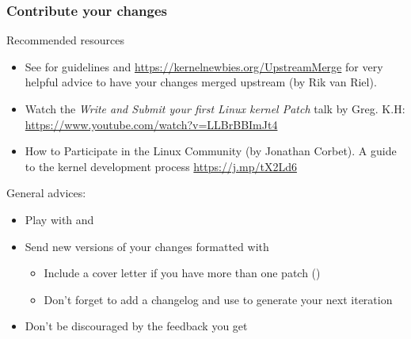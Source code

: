 \begin{frame}
  \frametitle{Contribute your changes}
  Recommended resources
  \begin{itemize}
  \item See  for guidelines
    and \url{https://kernelnewbies.org/UpstreamMerge} for very
    helpful advice to have your changes merged upstream (by Rik van
    Riel).
  \item Watch the \emph{Write and Submit your first Linux kernel
      Patch} talk by Greg. K.H:
    \url{https://www.youtube.com/watch?v=LLBrBBImJt4}
  \item How to Participate in the Linux Community (by Jonathan
    Corbet). A guide to the kernel development process
    \url{https://j.mp/tX2Ld6}
  \end{itemize}
  General advices:
  \begin{itemize}
  \item Play with  and 
  \item Send new versions of your changes formatted with 
    \begin{itemize}
    \item Include a cover letter if you have more than one patch
      ()
    \item Don't forget to add a changelog and use  to generate
      your next iteration
    \end{itemize}
  \item Don't be discouraged by the feedback you get
  \end{itemize}
\end{frame}
